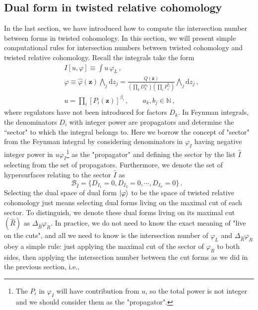 \documentclass[a4paper,11pt]{article}
\newcommand{\nn}{\nonumber}
\newcommand{\nd}{\mathrm{d}}
\begin{document}
\subsection{Dual form in twisted relative cohomology}
In the last section, we have introduced how to compute the intersection number between forms in twisted cohomology. In this section, we will 
present simple computational rules for intersection numbers between twisted cohomology and twisted relative cohomology. 
Recall the integrals take the form
\begin{align}
&I[u,\varphi] \equiv \int  u \, \varphi_L  \,,   \nn \\
&\varphi \equiv \hat{\varphi}(\bm{z}) \bigwedge_j \nd z_j =\frac{Q(\bm{z})}{\left(\prod_k D_k^{a_k} \right) \left(\prod_i P_i^{b_i} \right)} \bigwedge_j \nd z_j \, , \nn\\
&u=\prod_i \left[P_i(\bm{z})\right]^{\beta_i} \,,
    \quad \quad  a_k, b_j\in \mathbb{N}  \, ,
    \label{eq:baikov1}
\end{align}
where regulators have not been introduced for factors $ D_k$.  
In Feynman integrals, the  denominators $D_i$ with integer power are propagators and determine the “sector" to which the integral belongs to. Here we borrow the concept of "sector" from the Feynman integral by considering  denominators in $\varphi_I$ having negative integer power in $u\varphi_I$\footnote{The $P_i$ in $\varphi_I$  will have contribution from $u$, so the total power is not integer and we should consider them as the "propagator". }
as the "propagator" and defining the sector by the list $\hat{I}$ selecting from the set of propagators. Furthermore, we denote the set of hypersurfaces relating to the sector $\hat{I}$ as  
\begin{equation}
\mathcal{B}_{\hat{I}} = \{D_{I_1}=0,D_{I_2}=0,\cdots,D_{I_n}=0  \} \, . ~~~\label{B-cut}
\end{equation}
Selecting the dual space of dual form $\ket{\varphi}$ to be the space of twisted  relative cohomology just means selecting  dual forms living on the maximal cut of each sector. To distinguish, we denote these dual forms living on its maximal cut $(\hat{R})$ as $\Delta_{\hat{R}}\varphi_R$. In practice, we do not need to know the exact meaning of "live on the cuts", and all we need to know is the intersection number of $\varphi_L$ and $\Delta_{\hat{R}}\varphi_R$ obey a simple rule: just applying the maximal cut of the sector of $\varphi_R$ to both sides, then applying the intersection number between the cut forms as we did in the previous section, i.e.,
\end{document}
